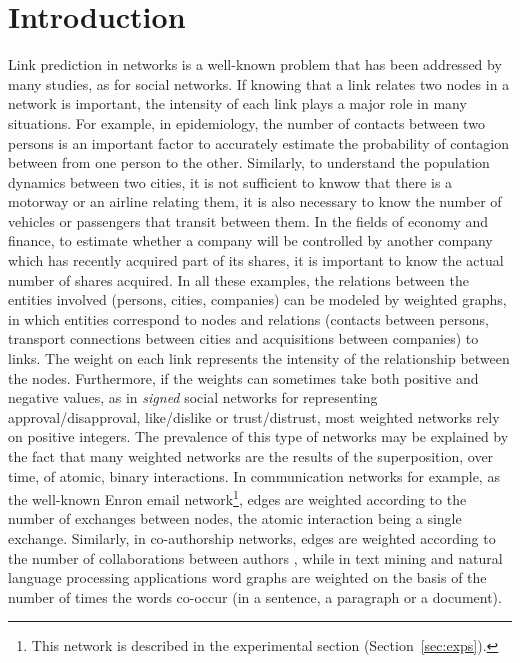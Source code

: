 \section{Introduction}

Link prediction in networks is a well-known problem that has been addressed by many studies, as \cite{Liben2007,Zaki2011,Martinez2016} for social networks. If knowing that a link relates two nodes in a network is important, the intensity of each link plays a major role in many situations. For example, in epidemiology, the number of contacts between two persons is an important factor to accurately estimate the probability of contagion between from one person to the other. Similarly, to understand the population dynamics between two cities, it is not sufficient to knwow that there is a motorway or an airline relating them, it is also necessary to know the number of vehicles or passengers that transit between them. In the fields of economy and finance, to estimate whether a company will be controlled by another company which has recently acquired part of its shares, it is important to know the actual number of shares acquired. In all these examples, the relations between the entities involved (persons, cities, companies) can be modeled by weighted graphs, in which entities correspond to nodes and relations (contacts between persons, transport connections between cities and acquisitions between companies) to links. The weight on each link represents the intensity of the relationship between the nodes. Furthermore, if the weights can sometimes take both positive and negative values, as in \textit{signed} social networks \cite{Kumar2016} for representing approval/disapproval, like/dislike or trust/distrust, most weighted networks rely on positive integers. The prevalence of this type of networks may be explained by the fact that many weighted networks are the results of the superposition, over time, of atomic, binary interactions. In communication networks for example, as the well-known Enron email network\footnote{This network is described in the experimental section (Section~\ref{sec:exps}).}, edges are weighted according to the number of exchanges between nodes, the atomic interaction being a single exchange. Similarly, in co-authorship networks, edges are weighted according to the number of collaborations between authors \cite{newman2001scientific}, while in text mining and natural language processing applications word graphs are weighted on the basis of the number of times the words co-occur (in a sentence, a paragraph or a document).

